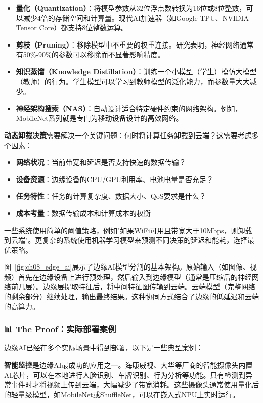 \begin{itemize}
    \item \textbf{量化（Quantization）}：将模型参数从32位浮点数转换为16位或8位整数，可以减少4倍的存储空间和计算量。现代AI加速器（如Google TPU、NVIDIA Tensor Core）都支持8位整数运算。
    \item \textbf{剪枝（Pruning）}：移除模型中不重要的权重连接。研究表明，神经网络通常有50\%-90\%的参数可以移除而不显著影响精度。
    \item \textbf{知识蒸馏（Knowledge Distillation）}：训练一个小模型（学生）模仿大模型（教师）的行为。学生模型可以学习到教师模型的泛化能力，而参数量大大减少。
    \item \textbf{神经架构搜索（NAS）}：自动设计适合特定硬件约束的网络架构。例如，MobileNet系列就是专门为移动设备设计的高效网络。
\end{itemize}

\textbf{动态卸载决策}需要解决一个关键问题：何时将计算任务卸载到云端？这需要考虑多个因素：

\begin{itemize}
    \item \textbf{网络状况}：当前带宽和延迟是否支持快速的数据传输？
    \item \textbf{设备资源}：边缘设备的CPU/GPU利用率、电池电量是否充足？
    \item \textbf{任务特性}：任务的计算复杂度、数据大小、QoS要求是什么？
    \item \textbf{成本考量}：数据传输成本和计算成本的权衡
\end{itemize}

一些系统使用简单的阈值策略，例如"如果WiFi可用且带宽大于10Mbps，则卸载到云端"。更复杂的系统使用机器学习模型来预测不同决策的延迟和能耗，选择最优策略。

图~\ref{fig:ch08_edge_ai}展示了边缘AI模型分割的基本架构。原始输入（如图像、视频）首先在边缘设备上进行预处理，然后输入到边缘模型（通常是压缩后的神经网络前几层）。边缘层提取特征后，将中间特征图传输到云端。云端模型（完整网络的剩余部分）继续处理，输出最终结果。这种协同方式结合了边缘的低延迟和云端的高算力。

\subsubsection{📊 The Proof：实际部署案例}

边缘AI已经在多个实际场景中得到部署，以下是一些典型案例：

\textbf{智能监控}是边缘AI最成功的应用之一。海康威视、大华等厂商的智能摄像头内置AI芯片，可以在本地进行人脸识别、车牌识别、行为分析等功能。只有检测到异常事件时才将视频上传到云端，大幅减少了带宽消耗。这些摄像头通常使用量化后的轻量级模型，如MobileNet或ShuffleNet，可以在嵌入式NPU上实时运行。

